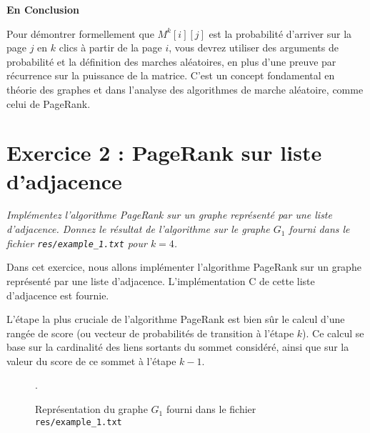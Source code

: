 \textbf{En Conclusion}

Pour démontrer formellement que $M^k[i][j]$ est la probabilité d'arriver sur la page $j$ en $k$ clics à partir de la page $i$, vous devrez utiliser des arguments de probabilité et la définition des marches aléatoires, en plus d'une preuve par récurrence sur la puissance de la matrice. C'est un concept fondamental en théorie des graphes et dans l'analyse des algorithmes de marche aléatoire, comme celui de PageRank.

\section{Exercice 2 : PageRank sur liste d'adjacence}

\textit{Implémentez l'algorithme PageRank sur un graphe représenté par une liste d'adjacence. Donnez le résultat de l'algorithme sur le graphe $G_1$ fourni dans le fichier \texttt{res/example\_1.txt} pour $k = 4$.}

Dans cet exercice, nous allons implémenter l'algorithme PageRank sur un graphe représenté par une liste d'adjacence. L'implémentation C de cette liste d'adjacence est fournie.

L'étape la plus cruciale de l'algorithme PageRank est bien sûr le calcul d'une rangée de score (ou vecteur de probabilités de transition à l'étape $k$). Ce calcul se base sur la cardinalité des liens sortants du sommet considéré, ainsi que sur la valeur du score de ce sommet à l'étape $k-1$.

\begin{figure}
    \centering
    \caption{Représentation du graphe $G_1$ fourni dans le fichier \texttt{res/example\_1.txt}}.
    \label{fig:graph_g1}
\end{figure}

